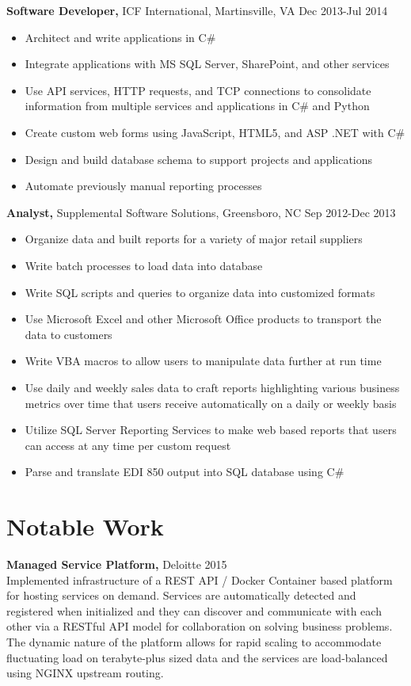 \documentclass{res}
\begin{document}
\begin{resume}
  {\bf Software Developer,} ICF International, Martinsville, VA \hfill Dec 2013-Jul 2014
    \begin{itemize} \itemsep -2pt  %
      \item Architect and write applications in C\#
      \item Integrate applications with MS SQL Server, SharePoint, and other services
      \item Use API services, HTTP requests, and TCP connections to consolidate information from multiple services and applications in C\# and Python
      \item Create custom web forms using JavaScript, HTML5, and ASP .NET with C\#
      \item Design and build database schema to support projects and applications
      \item Automate previously manual reporting processes
    \end{itemize}

 
  {\bf Analyst,} Supplemental Software Solutions, Greensboro, NC \hfill  Sep 2012-Dec 2013
    \begin{itemize} \itemsep -2pt %
      \item Organize data and built reports for a variety of major retail suppliers
      \item Write batch processes to load data into database
      \item Write SQL scripts and queries to organize data into customized formats
      \item Use Microsoft Excel and other Microsoft Office products to transport the data to customers
      \item Write VBA macros to allow users to manipulate data further at run time
      \item Use daily and weekly sales data to craft reports highlighting various business metrics over time that users receive automatically on a daily or weekly basis
      \item Utilize SQL Server Reporting Services to make web based reports that users can access at any time per custom request
      \item Parse and translate EDI 850 output into SQL database using C\#
    \end{itemize}

\section{Notable Work} 
  {\bf Managed Service Platform,} Deloitte \hfill 2015 \\
    Implemented infrastructure of a REST API / Docker Container based platform for hosting services on demand. Services are automatically detected and registered when initialized and they can discover and communicate with each other via a RESTful API model for collaboration on solving business problems. The dynamic nature of the platform allows for rapid scaling to accommodate fluctuating load on terabyte-plus sized data and the services are load-balanced using NGINX upstream routing.
    

\end{resume}
\end{document}
